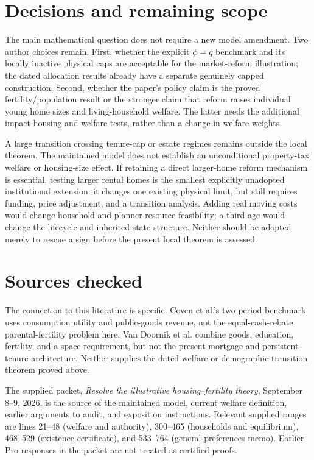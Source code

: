 \documentclass[11pt]{article}
\begin{document}
\section{Decisions and remaining scope}
The main mathematical question does not require a new model amendment. Two author choices remain. First, whether the explicit $\phi=q$ benchmark and its locally inactive physical caps are acceptable for the market-reform illustration; the dated allocation results already have a separate genuinely capped construction. Second, whether the paper's policy claim is the proved fertility/population result or the stronger claim that reform raises individual young home sizes and living-household welfare. The latter needs the additional impact-housing and welfare tests, rather than a change in welfare weights.

A large transition crossing tenure-cap or estate regimes remains outside the local theorem. The maintained model does not establish an unconditional property-tax welfare or housing-size effect. If retaining a direct larger-home reform mechanism is essential, testing larger rental homes is the smallest explicitly unadopted institutional extension: it changes one existing physical limit, but still requires funding, price adjustment, and a transition analysis. Adding real moving costs would change household and planner resource feasibility; a third age would change the lifecycle and inherited-state structure. Neither should be adopted merely to rescue a sign before the present local theorem is assessed.

\section*{Sources checked}
The connection to this literature is specific. Coven et al.'s two-period benchmark uses consumption utility and public-goods revenue, not the equal-cash-rebate parental-fertility problem here. Van Doornik et al. combine goods, education, fertility, and a space requirement, but not the present mortgage and persistent-tenure architecture. Neither supplies the dated welfare or demographic-transition theorem proved above.


The supplied packet, \emph{Resolve the illustrative housing--fertility theory}, September 8--9, 2026, is the source of the maintained model, current welfare definition, earlier arguments to audit, and exposition instructions. Relevant supplied ranges are lines 21--48 (welfare and authority), 300--465 (households and equilibrium), 468--529 (existence certificate), and 533--764 (general-preferences memo). Earlier Pro responses in the packet are not treated as certified proofs.
\end{document}
